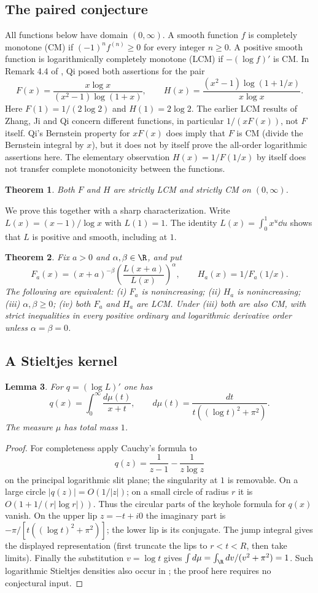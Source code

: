 \documentclass[11pt,a4paper]{article}
\numberwithin{equation}{section}
\newtheorem{theorem}{Theorem}[section]
\newtheorem{lemma}[theorem]{Lemma}
\theoremstyle{definition}
\theoremstyle{remark}
\begin{document}
\subsection{The paired conjecture}
All functions below have domain $(0,\infty)$. A smooth function $f$ is completely monotone (CM) if $(-1)^nf^{(n)}\ge0$ for every integer $n\ge0$. A positive smooth function is logarithmically completely monotone (LCM) if $-(\log f)'$ is CM. In Remark 4.4 of \cite{r27keio:Qi}, Qi posed both assertions for the pair
\[
 F(x)=\frac{x\log x}{(x^2-1)\log(1+x)},\qquad
 H(x)=\frac{(x^2-1)\log(1+1/x)}{x\log x}.
\]
Here $F(1)=1/(2\log2)$ and $H(1)=2\log2$. The earlier LCM results of Zhang, Ji and Qi \cite{r27keio:ZJQ} concern different functions, in particular $1/(xF(x))$, not $F$ itself. Qi's Bernstein property for $xF(x)$ \cite[Theorem 4.3]{r27keio:Qi} does imply that $F$ is CM (divide the Bernstein integral by $x$), but it does not by itself prove the all-order logarithmic assertions here. The elementary observation $H(x)=1/F(1/x)$ by itself does not transfer complete monotonicity between the functions.
\begin{theorem}\label{r27keio:main}
Both $F$ and $H$ are strictly LCM and strictly CM on $(0,\infty)$.
\end{theorem}
We prove this together with a sharp characterization. Write $L(x)=(x-1)/\log x$ with $L(1)=1$. The identity $L(x)=\int_0^1x^u\dd u$ shows that $L$ is positive and smooth, including at $1$.
\begin{theorem}\label{r27keio:general}
Fix $a>0$ and $\alpha,\beta\in\R$, and put
\[
 F_a(x)=(x+a)^{-\beta}\left(\frac{L(x+a)}{L(x)}\right)^\alpha,
 \qquad H_a(x)=1/F_a(1/x).
\]
The following are equivalent: (i) $F_a$ is nonincreasing; (ii) $H_a$ is nonincreasing; (iii) $\alpha,\beta\ge0$; (iv) both $F_a$ and $H_a$ are LCM. Under (iii) both are also CM, with strict inequalities in every positive ordinary and logarithmic derivative order unless $\alpha=\beta=0$.
\end{theorem}
\subsection{A Stieltjes kernel}
\begin{lemma}
For $q=(\log L)'$ one has
\[
 q(x)=\int_0^\infty\frac{d\mu(t)}{x+t},\qquad
 d\mu(t)=\frac{dt}{t((\log t)^2+\pi^2)} .
\]
The measure $\mu$ has total mass $1$.
\end{lemma}
\begin{proof}
For completeness apply Cauchy's formula to
\[
 q(z)=\frac{1}{z-1}-\frac{1}{z\log z}
\]
on the principal logarithmic slit plane; the singularity at $1$ is removable. On a large circle $|q(z)|=O(1/|z|)$; on a small circle of radius $r$ it is $O(1+1/(r|\log r|))$. Thus the circular parts of the keyhole formula for $q(x)$ vanish. On the upper lip $z=-t+i0$ the imaginary part is $-\pi/[t((\log t)^2+\pi^2)]$; the lower lip is its conjugate. The jump integral gives the displayed representation (first truncate the lips to $r<t<R$, then take limits). Finally the substitution $v=\log t$ gives $\int d\mu=\int_\R dv/(v^2+\pi^2)=1$. Such logarithmic Stieltjes densities also occur in \cite{r27keio:ZJQ,r27keio:Qi}; the proof here requires no conjectural input.
\end{proof}
\end{document}
